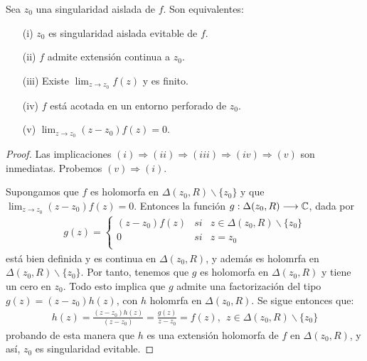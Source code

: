 \begin{teo}
    Sea $z_0$ una singularidad aislada de $f$. Son equivalentes:
    \begin{enumerate}
        \item[(i)] $z_0$ es singularidad aislada evitable de $f$.
        \item[(ii)] $f$ admite extensión continua a $z_0$.
        \item[(iii)] Existe $\lim_{z \to z_0} f(z)$ y es finito.
        \item[(iv)] $f$ está acotada en un entorno perforado de $z_0$.
        \item[(v)] $\lim_{z \to z_0} (z-z_0)f(z) = 0$.
    \end{enumerate}
\end{teo}

\begin{proof}
    Las implicaciones $(i) \Longrightarrow (ii) \Longrightarrow (iii) \Longrightarrow (iv) \Longrightarrow (v)$ son inmediatas. Probemos $(v) \Longrightarrow (i)$.

    Supongamos que $f$ es holomorfa en $\Delta(z_0,R) \backslash \{z_0\}$ y que $\lim_{z \to z_0} (z-z_0)f(z) = 0$. Entonces la función $g: \Delta(z_0,R) \longrightarrow \mathbb{C}$, dada por
    \begin{align*}
        g(z) = \left\{ \begin{array}{lcc}
                           (z-z_0)f(z) & si & z \in \Delta(z_0,R) \backslash \{z_0\} \\
                           0           & si & z = z_0                                \\
                       \end{array}
        \right.
    \end{align*}
    está bien definida y es continua en $\Delta(z_0,R)$, y además es holomrfa en $\Delta(z_0,R) \backslash \{z_0\}$. Por tanto, tenemos que $g$ es holomorfa en $\Delta(z_0,R)$ y tiene un cero en $z_0$. Todo esto implica que $g$ admite una factorización del tipo $g(z) = (z-z_0)h(z)$, con $h$ holomrfa en $\Delta(z_0,R)$. Se sigue entonces que:
    \begin{align*}
        h(z) = \frac{(z-z_0)h(z)}{(z-z_0)} = \frac{g(z)}{z-z_0} = f(z), \ \ z \in \Delta(z_0,R) \backslash \{z_0\}
    \end{align*}
    probando de esta manera que $h$ es una extensión holomorfa de $f$ en $\Delta(z_0,R)$, y así, $z_0$ es singularidad evitable.
\end{proof}

